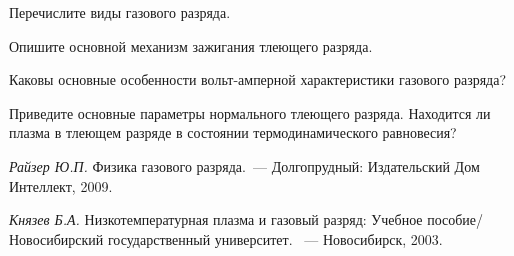 \begin{lab:questions}
 \item Перечислите виды газового разряда.
 
 \item Опишите основной механизм зажигания тлеющего разряда.
 
 \item Каковы основные особенности вольт-амперной характеристики газового разряда?
 
  \item Приведите основные параметры нормального тлеющего разряда. Находится
 ли плазма в тлеющем разряде в состоянии термодинамического равновесия?
  
\end{lab:questions}

\begin{lab:literature}
   \item \textit{Райзер Ю.П.} Физика газового разряда.~--- Долгопрудный: Издательский
   Дом Интеллект, 2009.
   
   \item \textit{Князев Б.А.} Низкотемпературная плазма и газовый разряд: Учебное
   пособие/ Новосибирский государственный университет. ~--- Новосибирск, 2003.
\end{lab:literature}

\endgroup %
